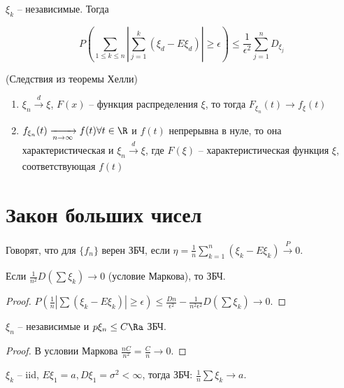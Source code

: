 \begin{theorem}
$\xi_k$ -- независимые. Тогда

$$P(\sum\limits_{1\leq k \leq n} |\sum\limits_{j = 1}^k(\xi_d - E\xi_d)| \geq \epsilon) \leq \frac{1}{\epsilon^2}\sum\limits_{j=1}^n D_{\xi_j}$$
\end{theorem}

\begin{theorem} (Следствия из теоремы Хелли)

\begin{enumerate}

\item $\xi_n \xrightarrow[]{d} \xi$, $F(x)$ -- функция распределения $\xi$, то тогда $F_{\xi_n}(t) \to f_\xi(t)$
\item $f_{\xi_n}(t) \xrightarrow[n \to \infty]{} f(t) \forall t \in \R$  и $f(t)$ непрерывна в нуле, 
то она характеристическая и $\xi_n \xrightarrow[]{d} \xi$, где $F(\xi)$ -- характеристическая функция $\xi$, соответствующая $f(t)$

\end{enumerate}


\end{theorem}
\section{Закон больших чисел}
\begin{Def}
Говорят, что для $\{f_n\}$ верен ЗБЧ, если $\eta = \frac1n \sum\limits_{k=1}^n (\xi_k - E\xi_k) \xrightarrow[]{P} 0$.
\end{Def}

\begin{theorem}[Марков]
Если $\frac{1}{n^2} D (\sum \xi_k) \to 0$ (условие Маркова), то ЗБЧ.
\end{theorem}
\begin{proof}
$P(\frac1n | \sum (\xi_k - E\xi_k) | \geq \epsilon) \leq \frac{Dn}{\epsilon^2} - \frac{1}{n^2 \epsilon^2} D(\sum \xi_k) \to 0$.
\end{proof}

\begin{theorem}[Чебышев]
$\xi_n$ -- независимые и $p\xi_n \leq C \Ra$ ЗБЧ.
\end{theorem}
\begin{proof}
В условии Маркова $\frac{nC}{n^2} = \frac{C}{n} \to 0$.
\end{proof}

\begin{theorem}[Хинчин]
$\xi_k$ -- iid, $E\xi_1 = a, D\xi_1 = \sigma^2 < \infty$, тогда ЗБЧ: $\frac1n \sum \xi_k \to a$.
\end{theorem}

